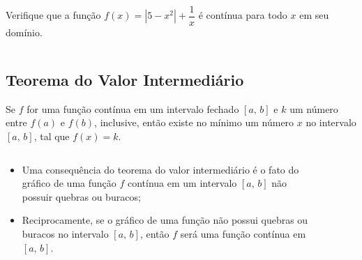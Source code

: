 \begin{frame}
  \begin{columns}[onlytextwidth]
    \begin{column}{0.49\textwidth}\vspace{-0.5cm}
      \begin{example}
        Verifique que a função $f(x) = |5-x^{2}| + \dfrac{1}{x}$ é contínua para todo $x$ em seu domínio.
      \end{example}
    \end{column}
    \begin{column}{0.49\textwidth}\vspace{-0.5cm}
    \end{column}
  \end{columns}
\end{frame}

\subsection{Teorema do Valor Intermediário}
\begin{frame}
  \begin{theorem}
    Se $f$ for uma função contínua em um intervalo fechado $[a,\,b]$ e $k$ um número entre $f(a)$ e $f(b)$, inclusive, então existe no mínimo um número $x$ no intervalo $[a,\,b]$, tal que $f(x)=k$.
  \end{theorem}
  \begin{columns}[onlytextwidth]
    \begin{column}{0.49\textwidth}
      \begin{highlight}
        \begin{itemize}
          \item Uma consequência do teorema do valor intermediário é o fato do gráfico de uma função $f$ contínua em um intervalo $[a,\,b]$ não possuir quebras ou buracos;
          \item Reciprocamente, se o gráfico de uma função não possui quebras ou buracos no intervalo $[a,\,b]$, então $f$ será uma função contínua em $[a,\,b]$.
        \end{itemize}
      \end{highlight}
    \end{column}
    \begin{column}{0.49\textwidth}
      \begin{figure}
      \end{figure}
    \end{column}
  \end{columns}
\end{frame}

